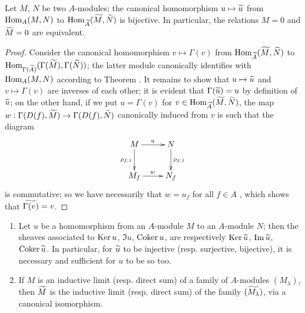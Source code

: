 \begin{cor}[1.3.8]
\label{1.1.3.8}
Let $M$, $N$ be two $A$-modules; the canonical homomorphism $u\mapsto\widetilde{u}$ from
${\mathop{\mathrm{Hom}}\nolimits}_A(M,N)$ to ${\mathop{\mathrm{Hom}}\nolimits}_{\widetilde{A}}(\widetilde{M},\widetilde{N})$ is bijective. In
particular, the relations $M=0$ and $\widetilde{M}=0$ are equivalent.
\end{cor}

\begin{proof}
\label{proof-1.1.3.8}
Consider the canonical homomorphism $v\mapsto\Gamma(v)$ from
${\mathop{\mathrm{Hom}}\nolimits}_{\widetilde{A}}(\widetilde{M},\widetilde{N})$ to
${\mathop{\mathrm{Hom}}\nolimits}_{\Gamma(\widetilde{A})}(\Gamma(\widetilde{M}),\Gamma(\widetilde{N}))$; the latter
module canonically identifies with ${\mathop{\mathrm{Hom}}\nolimits}_A(M,N)$ according to Theorem .
It remains to show that $u\mapsto\widetilde{u}$ and $v\mapsto\Gamma(v)$ are inverses of each
other; it is evident that $\Gamma(\widetilde{u})=u$ by definition of $\widetilde{u}$; on the
other hand, if we put $u=\Gamma(v)$ for
$v\in{\mathop{\mathrm{Hom}}\nolimits}_{\widetilde{A}}(\widetilde{M},\widetilde{N})$, the map
$w:\Gamma(D(f),\widetilde{M})\to\Gamma(D(f),\widetilde{N})$ canonically induced from $v$
is such that the diagram
\[
  \xymatrix{
    M\ar[r]^u\ar[d]_{\rho_{f,1}} & N\ar[d]^{\rho_{f,1}}\\
    M_f\ar[r]^w & N_f
  }
\]
is commutative; so we have necessarily that $w=u_f$ for all $f\in A$
, which shows that $\widetilde{\Gamma(v)}=v$.
\end{proof}

\begin{cor}[1.3.9]
\label{1.1.3.9}
\medskip\noindent
\begin{enumerate}[label=\emph{(\roman*)}]
  \item Let $u$ be a homomorphism from an $A$-module $M$ to an $A$-module $N$; then the sheaves associated to ${\mathop{\mathrm{Ker}}\nolimits}\, u$, $\Im u$, ${\mathop{\mathrm{Coker}}\nolimits}\, u$, are respectively ${\mathop{\mathrm{Ker}}\nolimits}\,\widetilde{u}$, ${\mathop{\mathrm{Im}}\nolimits}\,\widetilde{u}$, ${\mathop{\mathrm{Coker}}\nolimits}\,\widetilde{u}$.
    In particular, for $\widetilde{u}$ to be injective (resp. surjective, bijective), it is necessary and sufficient for $u$ to be so too.
  \item If $M$ is an inductive limit (resp. direct sum) of a family of $A$-modules
    $(M_\lambda)$, then $\widetilde{M}$ is the inductive limit (resp. direct sum) of the
    family $(\widetilde{M_\lambda})$, via a canonical isomorphism.
\end{enumerate}
\end{cor}

